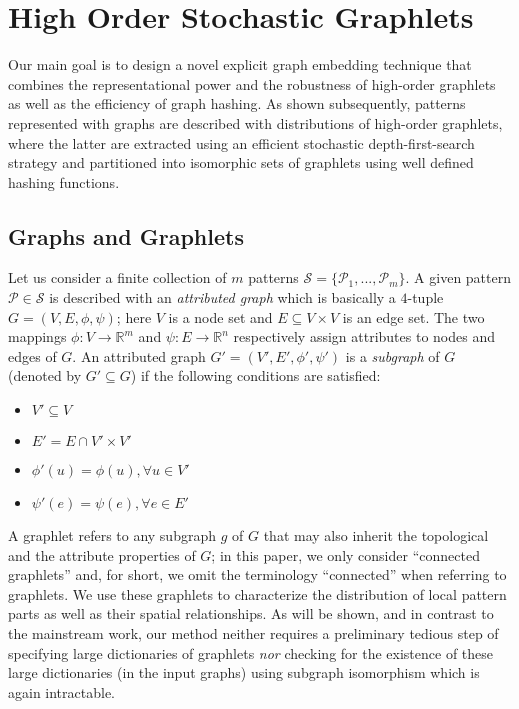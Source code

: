 \documentclass[journal]{IEEEtran}
\theoremstyle{definition}
\begin{document}
\section{High Order Stochastic Graphlets}
\label{sec:graphlets}

Our main goal is to design a novel explicit graph embedding technique that combines the representational power and the robustness of high-order graphlets as well as the efficiency of graph hashing. As shown subsequently, patterns represented with graphs are described with distributions of high-order graphlets, where the latter are extracted using an efficient stochastic depth-first-search strategy and partitioned into isomorphic sets of graphlets using well defined hashing functions.

\subsection{Graphs and Graphlets}
\label{ssec:graph-based-image-reprn}
Let us consider a finite collection of $m$ patterns $\mathcal{S} = \lbrace\mathcal{P}_1,...,\mathcal{P}_m\rbrace$. A given pattern $\mathcal{P}\in\mathcal{S}$ is described with an \emph{attributed graph} which is basically a $4$-tuple $G=(V,E,\phi,\psi)$; here $V$ is a node set and $E\subseteq V\times V$ is an edge set. The two mappings $\phi:V\rightarrow\mathbb{R}^m$ and $\psi:E\rightarrow\mathbb{R}^n$ respectively assign attributes to nodes and edges of $G$. An attributed graph $G'=(V',E',\phi',\psi')$ is a \emph{subgraph} of $G$ (denoted by $G'\subseteq G$) if the following conditions are satisfied:
\begin{itemize}
\item $V'\subseteq V$
\item $E'=E\cap V'\times V'$
\item $\phi'(u)=\phi(u), \forall u\in V'$
\item $\psi'(e)=\psi(e), \forall e\in E'$
\end{itemize}

A graphlet refers to any subgraph $g$ of $G$ that may also inherit the topological and the attribute properties of $G$; in this paper, we only consider ``connected graphlets'' and, for short, we omit the terminology ``connected'' when referring to graphlets. We use these graphlets to characterize the distribution of local pattern parts as well as their spatial relationships. As will be shown, and in contrast to the mainstream work, our method neither requires a preliminary tedious step of specifying large dictionaries of graphlets {\it nor} checking for the existence of these large dictionaries (in the input graphs) using subgraph isomorphism which is again intractable.
\end{document}
